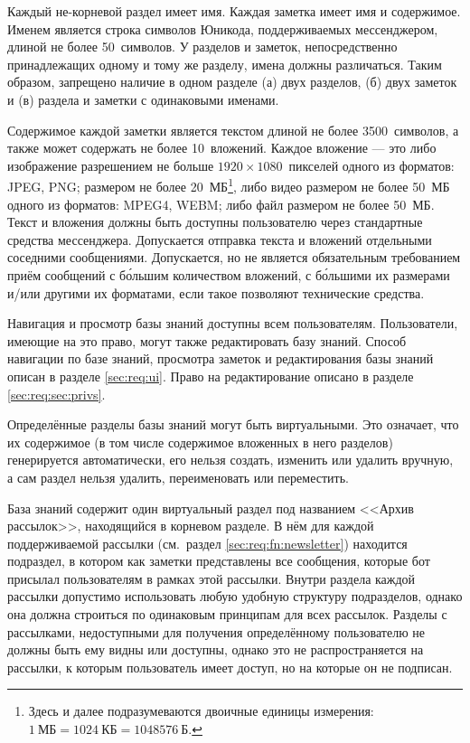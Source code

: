     Каждый не-корневой раздел имеет имя. Каждая заметка имеет имя и содержимое.
    Именем является строка символов Юникода, поддерживаемых мессенджером, длиной
    не более 50~символов. У разделов и заметок, непосредственно принадлежащих одному и тому же
    разделу, имена должны различаться. Таким образом, запрещено наличие в одном разделе
    (а) двух разделов, (б) двух заметок и (в) раздела и заметки с одинаковыми именами.

    Содержимое каждой заметки является текстом длиной не более 3500~символов, а также может содержать
    не более 10~вложений. Каждое вложение --- это либо изображение разрешением не больше
    \(1920 \times 1080\)~пикселей одного из форматов: JPEG, PNG; размером не более
    20~МБ\footnote{
        Здесь и далее подразумеваются двоичные единицы измерения: \(1~\text{МБ} = 1024~\text{КБ}
        = 1048576~\text{Б}\).
    }, либо видео размером не более 50~МБ одного из форматов: MPEG4, WEBM; либо файл размером не более 50~МБ.
    Текст и вложения должны быть доступны пользователю
    через стандартные средства мессенджера. Допускается отправка текста и вложений
    отдельными соседними сообщениями.
    Допускается, но не является обязательным требованием приём сообщений с б\'ольшим количеством вложений,
    с б\'ольшими их размерами и/или другими их форматами, если такое позволяют технические средства.

    Навигация и просмотр базы знаний доступны всем пользователям.
    Пользователи, имеющие на это право, могут также редактировать базу знаний.
    Способ навигации по базе знаний, просмотра заметок и редактирования базы знаний
    описан в разделе \ref{sec:req:ui}.
    Право на редактирование описано в разделе
    \ref{sec:req:sec:privs}.

    Определённые разделы базы знаний могут быть виртуальными. Это означает, что их содержимое
    (в том числе содержимое вложенных в него разделов)
    генерируется автоматически, его нельзя создать, изменить или удалить вручную,
    а сам раздел нельзя удалить, переименовать или переместить.

    База знаний содержит один виртуальный раздел под названием <<Архив рассылок>>,
    находящийся в корневом разделе. В нём для каждой поддерживаемой рассылки
    (см.~раздел \ref{sec:req:fn:newsletter}) находится
    подраздел, в котором как заметки представлены все сообщения, которые бот присылал пользователям
    в рамках этой рассылки. Внутри раздела каждой рассылки допустимо использовать любую
    удобную структуру подразделов, однако она должна строиться по одинаковым принципам для всех рассылок.
    Разделы с рассылками, недоступными для получения определённому пользователю не должны быть ему
    видны или доступны, однако это не распространяется на рассылки, к которым пользователь имеет
    доступ, но на которые он не подписан.

